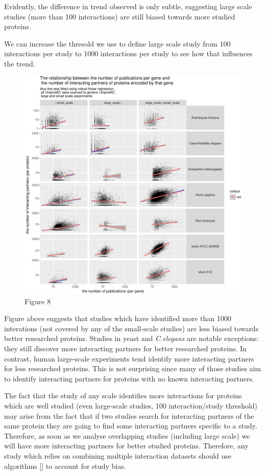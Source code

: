 \documentclass[]{article}
\begin{document}
Evidently, the difference in trend observed is only subtle, suggesting
large scale studies (more than 100 interactions) are still biased
towards more studied proteins.

We can increase the thresold we use to define large scale study from 100
interactions per study to 1000 interactions per study to see how that
influences the trend.

\begin{figure}[htbp]
\centering
\includegraphics{final_report_files/figure-latex/N_publications_vs_N_interactions_3groups3-1.pdf}
\caption{Figure 8}
\end{figure}

Figure above suggests that studies which have identified more than 1000
interations (not covered by any of the small-scale studies) are less
biased towards better researched proteins. Studies in yeast and
\emph{C.elegans} are notable exceptions: they still discover more
interacting partners for better researched proteins. In contrast, human
large-scale experiments tend identify more interacting partners for less
researched proteins. This is not surprising since many of those studies
aim to identify interacting partners for proteins with no known
interacting partners.

The fact that the study of any scale identifies more interactions for
proteins which are well studied (even large-scale studies, 100
interaction/study threshold) may arise from the fact that if two studies
search for interacting partners of the same protein they are going to
find some interacting partners specific to a study. Therefore, as soon
as we analyse overlapping studies (including large scale) we will have
more interacting partners for better studied proteins. Therefore, any
study which relies on combining multiple interaction datasets should use
algorithms {[}{]} to account for study bias.
\end{document}
